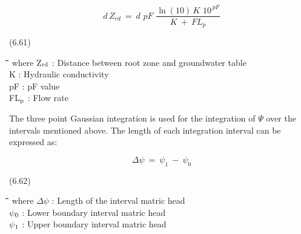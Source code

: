 \documentclass[11pt]{article}
\begin{document}
\begin{displaymath}
d\, Z _{rd} ~=~ d\,\, pF\,\,{\frac{\ln (10)\, K\,\, 10^{\, pF} }{K~+~FL _{p} }}
\end{displaymath}

 \bigskip
\strut\hfill (6.61)

\nwln
\begin{tabbing}
\hspace{1.27cm}\=\hspace{1.27cm}\=\hspace{1.27cm}\=\hspace{1.27cm}\=%
\hspace{1.27cm}\=\hspace{1.27cm}\=\hspace{1.27cm}\=\hspace{1.27cm}\=%
\hspace{1.27cm}\=\hspace{1.27cm}\=\kill
where\> Z$_{{\rm rd}}$\> : Distance between root zone and groundwater table\> \> \> \> \> \> \> \> [cm]\\
\>K\> : Hydraulic conductivity\> \> \> \> \> \> \> \> [cm d$^{{\rm -1}}$]\\
\>pF\> : pF value\> \> \> \> \> \> \> \> [-]\\
\>FL$_{{\rm p}}$\> : Flow rate\> \> \> \> \> \> \> \> [cm d$^{{\rm -1}}$]
\end{tabbing}

\bigskip
 The three point Gaussian integration is used for the integration of $\Psi$ over the intervals
mentioned above. The length of each integration interval can be expressed as:

\begin{displaymath}
\Delta \psi ~=~ \psi _{1} ~-~ \psi _{0} 
\end{displaymath}

 \bigskip
\strut\hfill (6.62)
\nwln
\begin{tabbing}
\hspace{1.27cm}\=\hspace{1.27cm}\=\hspace{1.27cm}\=\hspace{1.27cm}\=%
\hspace{1.27cm}\=\hspace{1.27cm}\=\hspace{1.27cm}\=\hspace{1.27cm}\=%
\hspace{1.27cm}\=\hspace{1.27cm}\=\kill
where\> $\Delta$$\psi$\> : Length of the interval matric head\> \> \> \> \> \> \> \> [cm]\\
\>$\psi$$_{{\rm 0}}$\> : Lower boundary interval matric head\> \> \> \> \> \> \> \> [cm]\\
\>$\psi$$_{{\rm 1}}$\> : Upper boundary interval matric head\> \> \> \> \> \> \> \> [cm]
\end{tabbing}
\end{document}
